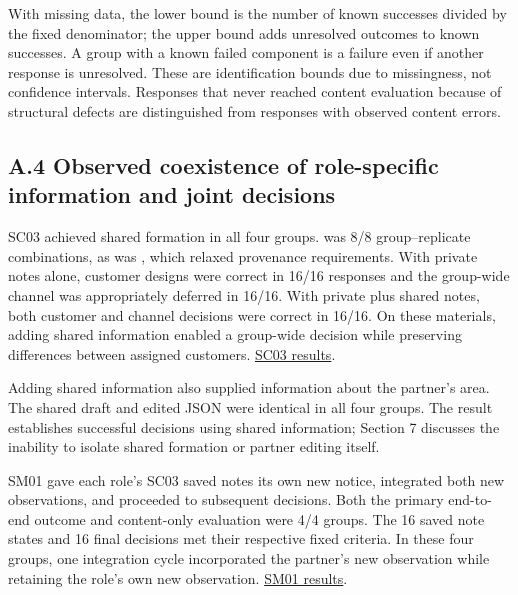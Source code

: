 \documentclass[10pt,a4paper]{article}
\begin{document}
With missing data, the lower bound is the number of known successes divided by the fixed denominator; the upper bound adds unresolved outcomes to known successes. A group with a known failed component is a failure even if another response is unresolved. These are identification bounds due to missingness, not confidence intervals. Responses that never reached content evaluation because of structural defects are distinguished from responses with observed content errors.

\subsection{A.4 Observed coexistence of role-specific information and joint decisions}\label{paper-01-a.4-observed-coexistence-of-role-specific-information-and-joint-decisions}

SC03 achieved shared formation in all four groups. \texttt{} was 8/8 group--replicate combinations, as was \texttt{}, which relaxed provenance requirements. With private notes alone, customer designs were correct in 16/16 responses and the group-wide channel was appropriately deferred in 16/16. With private plus shared notes, both customer and channel decisions were correct in 16/16. On these materials, adding shared information enabled a group-wide decision while preserving differences between assigned customers. \href{https://github.com/metaSATOKEN/MRSI/blob/9443de315d283874df0c27e0e99b8c04f400709d/docs/study2/shared-carry-03-results-v0.1-2026-09-18.md}{SC03 results}.

Adding shared information also supplied information about the partner's area. The shared draft and edited JSON were identical in all four groups. The result establishes successful decisions using shared information; Section 7 discusses the inability to isolate shared formation or partner editing itself.

SM01 gave each role's SC03 saved notes its own new notice, integrated both new observations, and proceeded to subsequent decisions. Both the primary end-to-end outcome and content-only evaluation were 4/4 groups. The 16 saved note states and 16 final decisions met their respective fixed criteria. In these four groups, one integration cycle incorporated the partner's new observation while retaining the role's own new observation. \href{https://github.com/metaSATOKEN/MRSI/blob/9443de315d283874df0c27e0e99b8c04f400709d/docs/study2/shared-merge-01-results-v0.1-2026-09-19.md}{SM01 results}.
\end{document}
